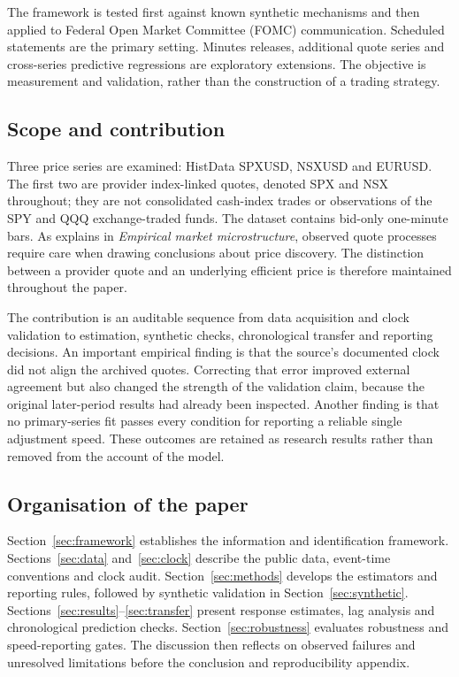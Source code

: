 The framework is tested first against known synthetic mechanisms and then applied to Federal Open Market Committee (FOMC) communication. Scheduled statements are the primary setting. Minutes releases, additional quote series and cross-series predictive regressions are exploratory extensions. The objective is measurement and validation, rather than the construction of a trading strategy.

\subsection{Scope and contribution}
Three price series are examined: HistData SPXUSD, NSXUSD and EURUSD. The first two are provider index-linked quotes, denoted SPX and NSX throughout; they are not consolidated cash-index trades or observations of the SPY and QQQ exchange-traded funds. The dataset contains bid-only one-minute bars. As  explains in \textit{Empirical market microstructure}, observed quote processes require care when drawing conclusions about price discovery. The distinction between a provider quote and an underlying efficient price is therefore maintained throughout the paper.

The contribution is an auditable sequence from data acquisition and clock validation to estimation, synthetic checks, chronological transfer and reporting decisions. An important empirical finding is that the source's documented clock did not align the archived quotes. Correcting that error improved external agreement but also changed the strength of the validation claim, because the original later-period results had already been inspected. Another finding is that no primary-series fit passes every condition for reporting a reliable single adjustment speed. These outcomes are retained as research results rather than removed from the account of the model.

\subsection{Organisation of the paper}
Section~\ref{sec:framework} establishes the information and identification framework. Sections~\ref{sec:data} and~\ref{sec:clock} describe the public data, event-time conventions and clock audit. Section~\ref{sec:methods} develops the estimators and reporting rules, followed by synthetic validation in Section~\ref{sec:synthetic}. Sections~\ref{sec:results}--\ref{sec:transfer} present response estimates, lag analysis and chronological prediction checks. Section~\ref{sec:robustness} evaluates robustness and speed-reporting gates. The discussion then reflects on observed failures and unresolved limitations before the conclusion and reproducibility appendix.

